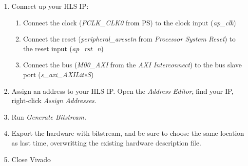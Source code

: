 \begin{enumerate}
	\item{Connect up your HLS IP:}
	
	\begin{enumerate}
		\item  Connect the clock (\emph{FCLK\_CLK0} from PS) to the clock input (\emph{ap\_clk})
		\item  Connect the reset (\emph{peripheral\_aresetn} from \emph{Processor System Reset}) to the reset input (\emph{ap\_rst\_n})
		\item Connect the bus (\emph{M00\_AXI} from the \emph{AXI Interconnect}) to the bus slave port (\emph{s\_axi\_AXILiteS})
	\end{enumerate}
	
	\item Assign an address to your HLS IP.  Open the \emph{Address Editor}, find your IP, right-click \emph{Assign Addresses}.
	
	\item Run \emph{Generate Bitstream.}
	
	\item Export the hardware with bitstream, and be sure to choose the same location as last time, overwritting the existing hardware description file.

	\item Close Vivado
\end{enumerate}


